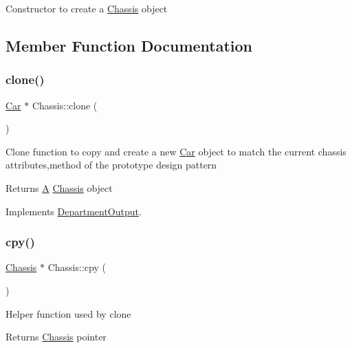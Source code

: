 Constructor to create a \hyperlink{classChassis}{Chassis} object 

\subsection{Member Function Documentation}
\mbox{\label{classChassis_a2700ee5437760643c7cad46e077dcbcd}} 
\subsubsection{\texorpdfstring{clone()}{clone()}}
{\footnotesize\ttfamily \hyperlink{classCar}{Car} $\ast$ Chassis\+::clone (\begin{DoxyParamCaption}{ }\end{DoxyParamCaption})\hspace{0.3cm}{\ttfamily [virtual]}}

Clone function to copy and create a new \hyperlink{classCar}{Car} object to match the current chassis attributes,method of the prototype design pattern \begin{DoxyReturn}{Returns}
\hyperlink{classA}{A} \hyperlink{classChassis}{Chassis} object 
\end{DoxyReturn}


Implements \hyperlink{classDepartmentOutput_ab20c9d559bca6ce8e6748dfac47c3f84}{Department\+Output}.

\mbox{\label{classChassis_a75bfca11337766c0dda9544f27987d18}} 
\subsubsection{\texorpdfstring{cpy()}{cpy()}}
{\footnotesize\ttfamily \hyperlink{classChassis}{Chassis} $\ast$ Chassis\+::cpy (\begin{DoxyParamCaption}{ }\end{DoxyParamCaption})}

Helper function used by clone \begin{DoxyReturn}{Returns}
\hyperlink{classChassis}{Chassis} pointer 
\end{DoxyReturn}
\mbox{\label{classChassis_a095c63aa079ebd8d7fc04f238fd1e56c}} 

